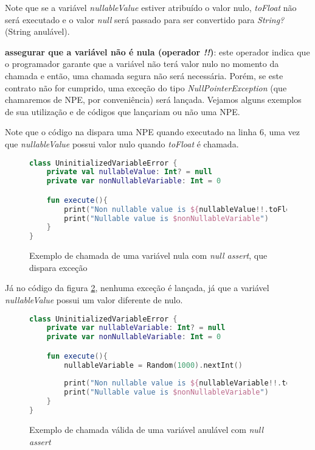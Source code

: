 Note que se a variável \textit{nullableValue} estiver atribuído o valor nulo, \textit{toFloat} não será executado e o valor \textit{null} será passado para ser convertido para \textit{String?} (String anulável).

\textbf{assegurar que a variável não é nula (operador \textit{!!})}: este operador indica que o programador garante que a variável não terá valor nulo no momento da chamada e então, uma chamada segura não será necessária. Porém, se este contrato não for cumprido, uma exceção do tipo \textit{NullPointerException} (que chamaremos de NPE, por conveniência) será lançada. Vejamos alguns exemplos de sua utilização e de códigos que lançariam ou não uma NPE.

Note que o código na  dispara uma NPE quando executado na linha 6, uma vez que \textit{nullableValue} possui valor nulo quando \textit{toFloat} é chamada.

\begin{figure}[H]
    \centering
    \begin{lstlisting}[language=Kotlin]
class UninitializedVariableError {
    private val nullableValue: Int? = null
    private var nonNullableVariable: Int = 0

    fun execute(){
        print("Non nullable value is ${nullableValue!!.toFloat()}")
        print("Nullable value is $nonNullableVariable")
    }
}
    \end{lstlisting}
    \caption{Exemplo de chamada de uma variável nula com \textit{null assert}, que dispara exceção}
    \label{fig:kotlin_not_init_variable_invalid_null_assert}
\end{figure}

Já no código da figura \ref{fig:kotlin_not_init_variable_valid_null_assert}, nenhuma exceção é lançada, já que a variável \textit{nullableValue} possui um valor diferente de nulo.

\begin{figure}[H]
    \centering
    \begin{lstlisting}[language=Kotlin]
class UninitializedVariableError {
    private var nullableVariable: Int? = null
    private var nonNullableVariable: Int = 0

    fun execute(){
        nullableVariable = Random(1000).nextInt()
        
        print("Non nullable value is ${nullableVariable!!.toFloat()}")
        print("Nullable value is $nonNullableVariable")
    }
}
    \end{lstlisting}
    \caption{Exemplo de chamada válida de uma variável anulável com \textit{null assert}}
    \label{fig:kotlin_not_init_variable_valid_null_assert}
\end{figure}

